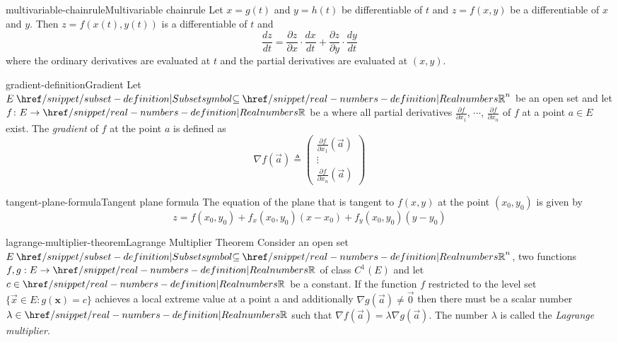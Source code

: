 \documentclass[preview]{standalone}
\begin{document}
\genpage

\begin{snippettheorem}{multivariable-chainrule}{Multivariable chainrule}
    Let \(x=g(t)\) and \(y=h(t)\) be differentiable \functions of \(t\)
    and \(z=f(x,y)\) be a differentiable \function of \(x\) and \(y\).
    Then \(z=f(x(t), y(t))\) is a differentiable \function of \(t\) and
    \[
        \frac{dz}{dt} =
        \frac{\partial z}{\partial x} \cdot \frac{dx}{dt} +
        \frac{\partial z}{\partial y} \cdot \frac{dy}{dt}
    \]
    where the ordinary derivatives are evaluated at \(t\) and the partial
    derivatives are evaluated at \((x,y)\).
\end{snippettheorem}

\begin{snippetdefinition}{gradient-definition}{Gradient}
    Let \(E \subseteq {\realnumbers}^n\) be an open set and
    let \(f\colon E \to \realnumbers\) be a \function where
    all partial derivatives \(\frac{\partial f}{\partial x_1}\),
    \(\cdots\), \(\frac{\partial f}{\partial x_n}\) of \(f\)
    at a point \(a\in E\) exist.
    The \textit{gradient} of \(f\) at the point \(a\)
    is defined as
    \[
        \nabla f(\vec{a}) \triangleq
        \left(\begin{array}{c}
        \frac{\partial f}{\partial x_1}(\vec{a}) \\
        \vdots \\
        \frac{\partial f}{\partial x_n}(\vec{a})
        \end{array}\right)
    \]
\end{snippetdefinition}

\begin{snippetproposition}{tangent-plane-formula}{Tangent plane formula}
    The equation of the plane that is tangent to \(f(x,y)\)
    at the point \((x_0, y_0)\) is given by
    \[
        z = f(x_0, y_0) + f_x(x_0, y_0)(x-x_0) + f_y(x_0, y_0)(y-y_0)
    \]
\end{snippetproposition}



\begin{snippettheorem}{lagrange-multiplier-theorem}{Lagrange Multiplier Theorem}
    Consider an open set $E \subseteq {\realnumbers}^n$, two functions $f, g: E \rightarrow \realnumbers$
    of class $C^1(E)$ and let $c \in \realnumbers$ be a constant.
    If the function $f$ restricted to the level set $\{\vec{x} \in E: g(\mathbf{x})=c\}$
    achieves a local extreme value at a point a and additionally
    $\nabla g(\vec{a}) \neq \vec{0}$ then there must be a scalar
    number $\lambda \in \realnumbers$ such that
    $\nabla f(\vec{a})=\lambda \nabla g(\vec{a})$. 
    The number $\lambda$ is called the \textit{Lagrange multiplier}.
\end{snippettheorem}


\end{document}

